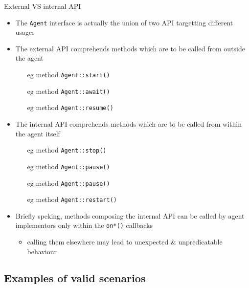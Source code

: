\documentclass[presentation]{beamer}\mode<presentation>{\usetheme{AMSCesenaPurpleAndGold}}
\begin{document}
\begin{frame}{External VS internal API}

\begin{itemize}
    \item The \texttt{Agent} interface is actually the union of two API targetting different usages
    
    \vfill
    
    \item The \alert{external} API comprehends methods which are to be called \alert{from outside} the agent
    \begin{itemize}
        \item[eg] method \texttt{Agent::\alert{start()}}
        \item[eg] method \texttt{Agent::\alert{await()}}
        \item[eg] method \texttt{Agent::\alert{resume()}}
    \end{itemize}
    
    \vfill
    
    \item The \alert{internal} API comprehends methods which are to be called \alert{from within} the agent itself
    \begin{itemize}
        \item[eg] method \texttt{Agent::\alert{stop()}}
        \item[eg] method \texttt{Agent::\alert{pause()}}
        \item[eg] method \texttt{Agent::\alert{pause()}}
        \item[eg] method \texttt{Agent::\alert{restart()}}
    \end{itemize}
    
    \vfill
    
    \item Briefly speking, methods composing the \alert{internal} API can be called by agent implementors \alert{only} within the \texttt{on*()} callbacks
    \begin{itemize}
        \item calling them elsewhere may lead to unexpected \& unpredicatable behaviour
    \end{itemize}
\end{itemize}

\end{frame}

\subsection{Examples of valid scenarios}
\end{document}
